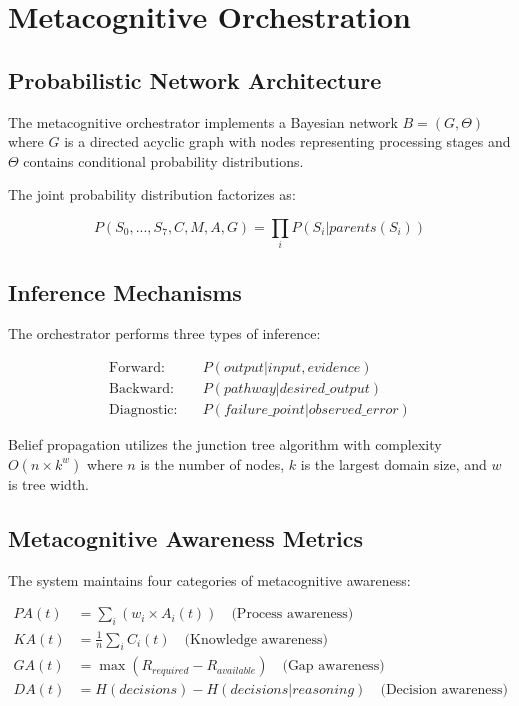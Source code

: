 \documentclass[12pt,a4paper]{article}
\begin{document}
\section{Metacognitive Orchestration}

\subsection{Probabilistic Network Architecture}

The metacognitive orchestrator implements a Bayesian network $B = (G, \Theta)$ where $G$ is a directed acyclic graph with nodes representing processing stages and $\Theta$ contains conditional probability distributions.

The joint probability distribution factorizes as:

\begin{equation}
P(S_0,...,S_7,C,M,A,G) = \prod_{i} P(S_i | parents(S_i))
\label{eq:joint_prob}
\end{equation}

\subsection{Inference Mechanisms}

The orchestrator performs three types of inference:

\begin{align}
\text{Forward:} \quad &P(output | input, evidence) \label{eq:forward_inf}\\
\text{Backward:} \quad &P(pathway | desired\_output) \label{eq:backward_inf}\\
\text{Diagnostic:} \quad &P(failure\_point | observed\_error) \label{eq:diagnostic_inf}
\end{align}

Belief propagation utilizes the junction tree algorithm with complexity $O(n \times k^w)$ where $n$ is the number of nodes, $k$ is the largest domain size, and $w$ is tree width.

\subsection{Metacognitive Awareness Metrics}

The system maintains four categories of metacognitive awareness:

\begin{align}
PA(t) &= \sum_i (w_i \times A_i(t)) \quad \text{(Process awareness)} \label{eq:process_aware}\\
KA(t) &= \frac{1}{n} \sum_i C_i(t) \quad \text{(Knowledge awareness)} \label{eq:knowledge_aware}\\
GA(t) &= \max(R_{required} - R_{available}) \quad \text{(Gap awareness)} \label{eq:gap_aware}\\
DA(t) &= H(decisions) - H(decisions | reasoning) \quad \text{(Decision awareness)} \label{eq:decision_aware}
\end{align}
\end{document}

